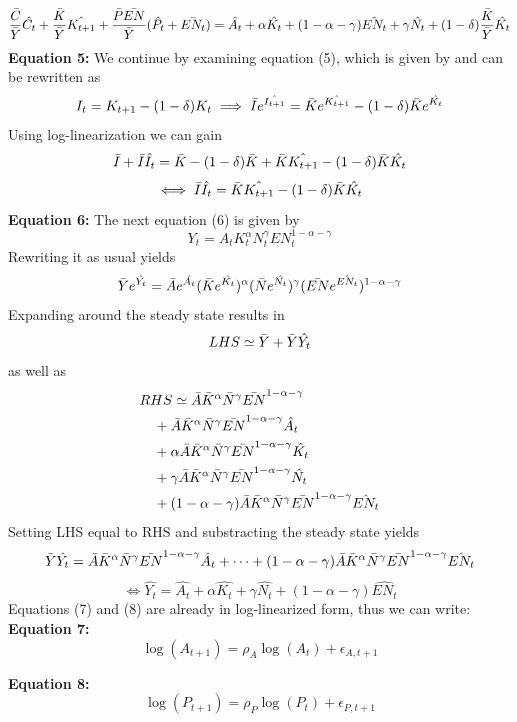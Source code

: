 \documentclass[a4paper,11pt]{article}
\begin{document}
$$\frac{\Bar{C}}{\Bar{Y}}\Hat{C_t} + \frac{\Bar{K}}{\Bar{Y}}\Hat{K_{t+1}} + \frac{\Bar{P}\Bar{EN}}{\Bar{Y}}(\Hat{P_t} + \Bar{EN_t}) = \hat{A_t} + \alpha \hat{K_t} + (1-\alpha-\gamma)\hat{EN_t} + \gamma\hat{N_t} + (1-\delta)\frac{\Bar{K}}{\Bar{Y}}\hat{K_t}$$
\textbf{Equation 5:}
We continue by examining equation (5), which is given by and can be rewritten as 
$$I_t = K_{t+1} - (1-\delta)K_t \implies \Bar{I}e^{\hat{I_{t+1}}} = \Bar{K}e^{\hat{K_{t+1}}} - (1- \delta)\Bar{K}e^{\hat{K_{t}}}$$
Using log-linearization we can gain
$$\Bar{I} + \Bar{I}\hat{I_t} = \Bar{K}-(1-\delta)\Bar{K} + \Bar{K}\hat{K_{t+1}}-(1-\delta)\Bar{K}\hat{K_{t}}$$
$$\iff \Bar{I}\hat{I_t} = \Bar{K}\hat{K_{t+1}}-(1-\delta)\Bar{K}\hat{K_{t}}$$
\textbf{Equation 6:}
The next equation (6) is given by
    $$Y_t = A_tK_t^\alpha N_t^\gamma EN_t^{1-\alpha-\gamma}$$
Rewriting it as usual yields
    $$\Bar{Y}e^{\hat{Y_t}} = \Bar{A}e^{\hat{A_t}}(\Bar{K}e^{\hat{K_t}})^\alpha (\Bar{N}e^{\hat{N_t}})^\gamma (\Bar{EN}e^{\hat{EN_t}})^{1-\alpha-\gamma}$$
Expanding around the steady state results in
$$LHS \simeq \Bar{Y} + \Bar{Y}\hat{Y_t}$$
as well as
\begin{align*}
	&RHS \simeq \Bar{A} \Bar{K}^{\alpha} \Bar{N}^\gamma \Bar{EN}^{1-\alpha-\gamma}\\
	&\quad + \Bar{A} \Bar{K}^{\alpha} \Bar{N}^\gamma \Bar{EN}^{1-\alpha-\gamma}\hat{A_t}\\
	&\quad + \alpha \Bar{A} \Bar{K}^{\alpha} \Bar{N}^\gamma \Bar{EN}^{1-\alpha-\gamma}\hat{K_t}\\
	&\quad + \gamma \Bar{A} \Bar{K}^{\alpha} \Bar{N}^\gamma \Bar{EN}^{1-\alpha-\gamma}\hat{N_t}\\
	&\quad + (1-\alpha-\gamma) \Bar{A} \Bar{K}^{\alpha} \Bar{N}^\gamma \Bar{EN}^{1-\alpha-\gamma}\hat{EN_t}\\
\end{align*}
Setting LHS equal to RHS and substracting the steady state yields
$$\Bar{Y}\hat{Y_t} = \Bar{A} \Bar{K}^{\alpha} \Bar{N}^\gamma \Bar{EN}^{1-\alpha-\gamma}\hat{A_t} + \cdots + (1-\alpha-\gamma) \Bar{A} \Bar{K}^{\alpha} \Bar{N}^\gamma \Bar{EN}^{1-\alpha-\gamma}\hat{EN_t}$$
$$\iff \hat{Y_t} = \hat{A_t} + \alpha \hat{K_t} + \gamma \hat{N_t} + (1-\alpha-\gamma)\hat{EN_t}$$
Equations (7) and (8) are already in log-linearized form, thus we can write:\\
\textbf{Equation 7:}\\
    $$\log(A_{t+1}) = \rho_A \log(A_{t}) + \epsilon_{A,t+1}$$

\textbf{Equation 8:}\\
    $$\log(P_{t+1}) = \rho_P \log(P_{t}) + \epsilon_{P,t+1}$$
\end{document}
